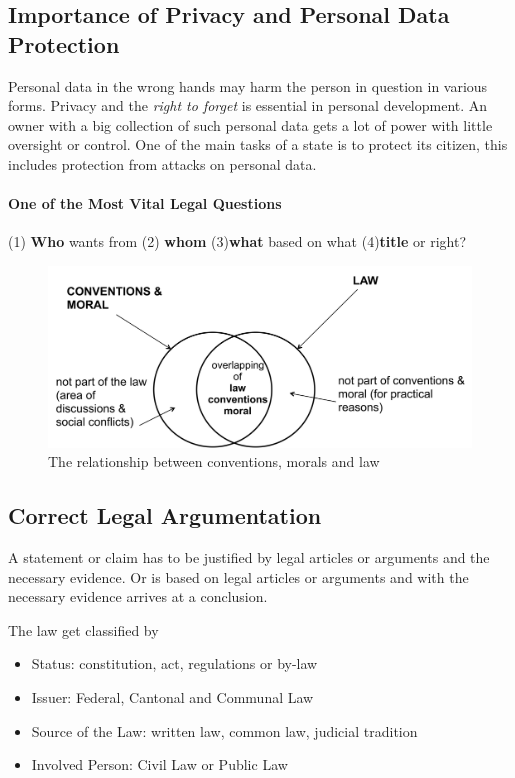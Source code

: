 \documentclass[11pt]{article}
\theoremstyle{definition}
\begin{document}
\subsection{Importance of Privacy and Personal Data Protection}
Personal data in the wrong hands may harm the person in question in various forms. Privacy and the \emph{right to forget} is essential in personal development. An owner with a big collection of such personal data gets a lot of power with little oversight or control. One of the main tasks of a state is to protect its citizen, this includes protection from attacks on personal data.

\paragraph{One of the Most Vital Legal Questions}
\begin{definition}
	{\scriptsize (1)} \textbf{Who} wants from {\scriptsize (2)} \textbf{whom} {\scriptsize (3)}\textbf{what} based on what {\scriptsize (4)}\textbf{title} or right?
\end{definition}

\begin{figure}[H]
	\centering
	\includegraphics[width=0.8\linewidth]{img/conventions_moral_law}
	\caption{The relationship between conventions, morals and law}
	\label{fig:conventionsmorallaw}
\end{figure}

\subsection{Correct Legal Argumentation}
A statement or claim has to be justified by legal articles or arguments and the necessary evidence. Or is based on legal articles or arguments and with the necessary evidence arrives at a conclusion.

The law get classified by
\begin{itemize}
	\item Status: constitution, act, regulations or by-law
	\item Issuer: Federal, Cantonal and Communal Law
	\item Source of the Law: written law, common law, judicial tradition
	\item Involved Person: Civil Law or Public Law
\end{itemize}
\end{document}
